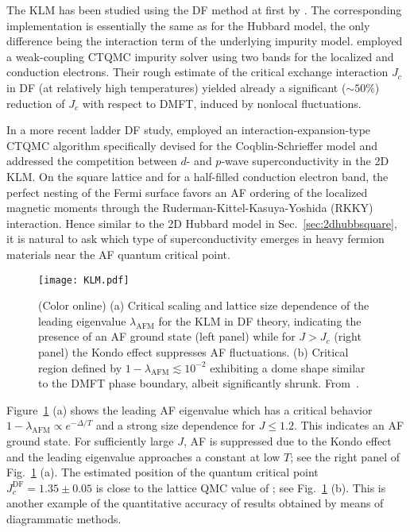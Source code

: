 \documentclass[rmp,aps,reprint,amsmath,amssymb,superscriptaddress,showpacs,nofootinbib]{revtex4-1}
\begin{document}
The  KLM has been studied using the DF method at first   by .  The corresponding implementation is essentially the same as for the Hubbard model, the only difference being the interaction term of the underlying impurity model.   employed a weak-coupling CTQMC impurity solver using two bands for the localized and conduction electrons. Their rough estimate of the critical exchange interaction $J_{c}$ in DF (at relatively high temperatures) yielded already a significant ($\sim 50\%$) reduction of  $J_{c}$  with respect to DMFT, induced by  nonlocal fluctuations.

In a more recent ladder DF study,  employed an interaction-expansion-type CTQMC algorithm specifically devised for the Coqblin-Schrieffer model and  addressed the competition between $d$- and $p$-wave superconductivity in the 2D  KLM. On the square lattice and for a half-filled conduction electron band, the perfect nesting of the Fermi surface favors an AF ordering of the localized magnetic moments through the  Ruderman-Kittel-Kasuya-Yoshida (RKKY) interaction. Hence similar to the 2D Hubbard model in Sec.~\ref{sec:2dhubbsquare}, it is natural to ask which type of superconductivity emerges in heavy fermion materials near the AF quantum critical point.

\begin{figure}[b]
\begin{center}
  \texttt{[image: KLM.pdf]} 
\end{center}
    \caption{(Color online)   (a) Critical scaling and lattice size dependence of the leading eigenvalue $\lambda_{\text{AFM}}$ for the KLM in DF theory, indicating the presence of an AF ground state (left panel) while for $J>J_{c}$  (right panel) the Kondo effect suppresses AF fluctuations. (b) Critical region defined by $1-\lambda_{\text{AFM}}\lesssim 10^{-2}$ exhibiting a dome shape similar to the DMFT phase boundary, albeit significantly shrunk. From~.}
\label{fig:phased_klm}
\end{figure}

Figure~\ref{fig:phased_klm} (a) shows the  leading AF eigenvalue which has a critical behavior $1-\lambda_{\text{AFM}}\propto e^{-\Delta/T}$ and a strong size dependence for $J\leq 1.2$. This indicates an AF ground state. For sufficiently large $J$, AF is suppressed due to the Kondo effect and the leading eigenvalue approaches a constant at low $T$; see the right panel of Fig.~\ref{fig:phased_klm} (a). The estimated position of the quantum critical point $J_{c}^{\text{DF}}=1.35\pm 0.05$ is close to the lattice QMC value of ; see Fig.~\ref{fig:phased_klm} (b). This is another example of the quantitative accuracy of results obtained by means of diagrammatic methods.
\end{document}
